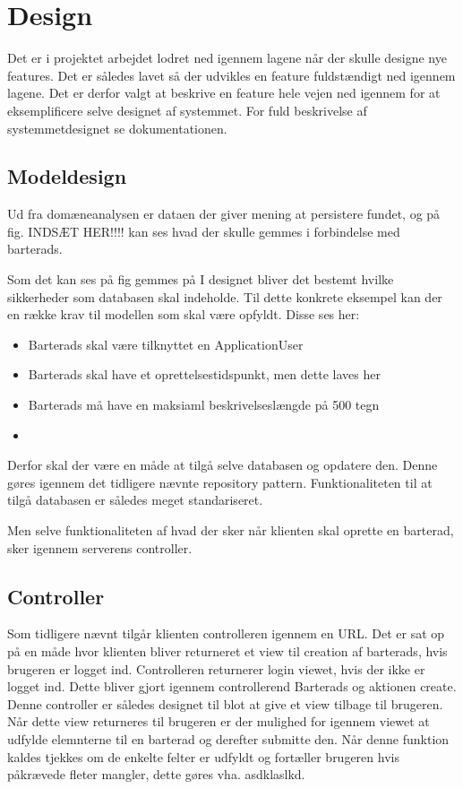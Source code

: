 \chapter{Design}

Det er i projektet arbejdet lodret ned igennem lagene når der skulle designe nye features. Det er således lavet så der udvikles en feature fuldstændigt ned igennem lagene. Det er derfor valgt at beskrive en feature hele vejen ned igennem for at eksemplificere selve designet af systemmet. For fuld beskrivelse af systemmetdesignet se dokumentationen. 

\section{Modeldesign}

Ud fra domæneanalysen er dataen der giver mening at persistere fundet, og på fig. INDSÆT HER!!!! kan ses hvad der skulle gemmes i forbindelse med barterads.


Som det kan ses på fig gemmes på 
I designet bliver det bestemt hvilke sikkerheder som databasen skal indeholde. Til dette konkrete eksempel kan der en række krav til modellen som skal være opfyldt. Disse ses her:

\begin{itemize}
	\item Barterads skal være tilknyttet en ApplicationUser
	\item Barterads skal have et oprettelsestidspunkt, men dette laves her
	\item Barterads må have en maksiaml beskrivelseslængde på 500 tegn
	\item 
\end{itemize}
Derfor skal der være en måde at tilgå selve databasen og opdatere den. Denne gøres igennem det tidligere nævnte repository pattern. Funktionaliteten til at tilgå databasen er således meget standariseret. 

Men selve funktionaliteten af hvad der sker når klienten skal oprette en barterad, sker igennem serverens controller. 

\section{Controller}  

Som tidligere nævnt tilgår klienten controlleren igennem en URL. Det er sat op på en måde hvor klienten bliver returneret et view til creation af barterads, hvis brugeren er logget ind. Controlleren returnerer login viewet, hvis der ikke er logget ind. Dette bliver gjort igennem controllerend Barterads og aktionen create. Denne controller er således designet til blot at give et view tilbage til brugeren. Når dette view returneres til brugeren er der mulighed for igennem viewet at udfylde elemnterne til en barterad og derefter submitte den. Når denne funktion kaldes tjekkes om de enkelte felter er udfyldt og fortæller brugeren hvis påkrævede fleter mangler, dette gøres vha. asdklaslkd.      

